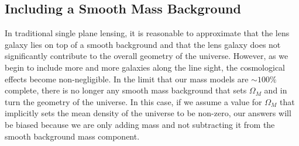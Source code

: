 \subsection{Including a Smooth Mass Background} \label{sec:Voids}
In traditional single plane lensing, it is reasonable to approximate that the lens galaxy lies on top of a smooth background and that the lens galaxy does not significantly contribute to the overall geometry of the universe. However, as we begin to include more and more galaxies along the line sight, the cosmological effects become non-negligible. In the limit that our mass models are $\sim100\%$ complete, there is no longer any smooth mass background that sets $\Omega_M$ and in turn the geometry of the universe. In this case, if we assume a value for $\Omega_M$ that implicitly sets the mean density of the universe to be non-zero, our answers will be biased because we are only adding mass and not subtracting it from the smooth background mass component. 
